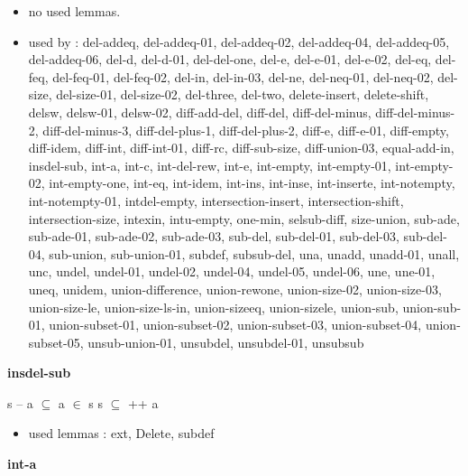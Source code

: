 \documentclass[a4paper]{article}
\begin{document}
\begin{itemize}


\item       no used lemmas.
\item       used by      : del-addeq, del-addeq-01, del-addeq-02, del-addeq-04, del-addeq-05, del-addeq-06, del-d, del-d-01, del-del-one, del-e, del-e-01, del-e-02, del-eq, del-feq, del-feq-01, del-feq-02, del-in, del-in-03, del-ne, del-neq-01, del-neq-02, del-size, del-size-01, del-size-02, del-three, del-two, delete-insert, delete-shift, delsw, delsw-01, delsw-02, diff-add-del, diff-del, diff-del-minus, diff-del-minus-2, diff-del-minus-3, diff-del-plus-1, diff-del-plus-2, diff-e, diff-e-01, diff-empty, diff-idem, diff-int, diff-int-01, diff-rc, diff-sub-size, diff-union-03, equal-add-in, insdel-sub, int-a, int-c, int-del-rew, int-e, int-empty, int-empty-01, int-empty-02, int-empty-one, int-eq, int-idem, int-ins, int-inse, int-inserte, int-notempty, int-notempty-01, intdel-empty, intersection-insert, intersection-shift, intersection-size, intexin, intu-empty, one-min, selsub-diff, size-union, sub-ade, sub-ade-01, sub-ade-02, sub-ade-03, sub-del, sub-del-01, sub-del-03, sub-del-04, sub-union, sub-union-01, subdef, subsub-del, una, unadd, unadd-01, unall, unc, undel, undel-01, undel-02, undel-04, undel-05, undel-06, une, une-01, uneq, unidem, union-difference, union-rewone, union-size-02, union-size-03, union-size-le, union-size-ls-in, union-sizeeq, union-sizele, union-sub, union-sub-01, union-subset-01, union-subset-02, union-subset-03, union-subset-04, union-subset-05, unsub-union-01, unsubdel, unsubdel-01, unsubsub

\end{itemize}

\medskip

\bigskip

{\large\bf insdel-sub}

\medskip

 \Fol \Not s -- a $\subseteq$  \And a $\in$ s \Imp \Not s $\subseteq$  ++ a

\begin{itemize}


\item       used lemmas  : ext, Delete, subdef

\end{itemize}

\medskip

\bigskip

{\large\bf int-a}
\end{document}
